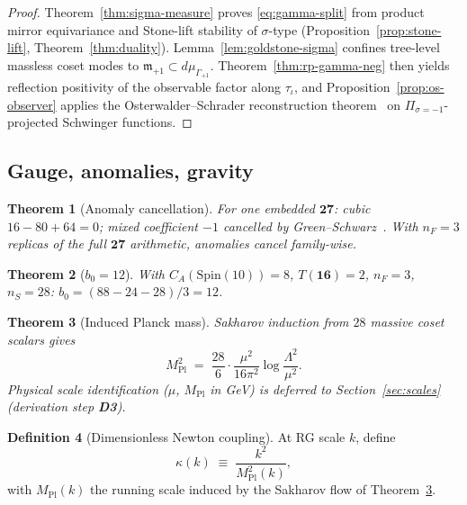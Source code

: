 \documentclass[11pt]{article}
\theoremstyle{plain}
\newtheorem{theorem}{Theorem}[section]
\theoremstyle{definition}
\newtheorem{definition}[theorem]{Definition}
\theoremstyle{remark}
\numberwithin{equation}{section}
\newcommand{\Spin}{\mathrm{Spin}}
\newcommand{\MPl}{M_{\mathrm{Pl}}}
\begin{document}
\begin{proof}
Theorem~\ref{thm:sigma-measure} proves \eqref{eq:gamma-split} from product
mirror equivariance and Stone-lift stability of $\sigma$-type
(Proposition~\ref{prop:stone-lift}, Theorem~\ref{thm:duality}).
Lemma~\ref{lem:goldstone-sigma} confines tree-level massless coset modes to
$\mathfrak{m}_{+1}\subset d\mu_{\Gamma_{+1}}$. Theorem~\ref{thm:rp-gamma-neg}
then yields reflection positivity of the observable factor along $\tau_\iota$,
and Proposition~\ref{prop:os-observer} applies the Osterwalder--Schrader
reconstruction theorem~\cite{OsterwalderSchrader1973} on
$\Pi_{\sigma=-1}$-projected Schwinger functions.
\end{proof}

\subsection{Gauge, anomalies, gravity}
\label{sec:physics:gauge}

\begin{theorem}[Anomaly cancellation]\label{thm:anomaly}
For one embedded $\mathbf{27}$: cubic $16-80+64=0$; mixed coefficient $-1$
cancelled by Green--Schwarz~\cite{GreenSchwarz1984}. With $n_F=3$ replicas of
the full $\mathbf{27}$ arithmetic, anomalies cancel family-wise.
\end{theorem}

\begin{theorem}[$b_0=12$]\label{thm:beta}
With $C_A(\Spin(10))=8$, $T(\mathbf{16})=2$, $n_F=3$, $n_S=28$:
$b_0=(88-24-28)/3=12$.
\end{theorem}

\begin{theorem}[Induced Planck mass]\label{thm:planck}
Sakharov induction from $28$ massive coset scalars gives
\begin{equation}\label{eq:planck}
  \MPl^2
  \;=\;
  \frac{28}{6}\cdot\frac{\mu^2}{16\pi^2}
  \log\frac{\Lambda^2}{\mu^2}.
\end{equation}
Physical scale identification ($\mu$, $\MPl$ in GeV) is deferred to
Section~\ref{sec:scales} (derivation step \textbf{D3}).
\end{theorem}

\begin{definition}[Dimensionless Newton coupling]\label{def:kappa}
At RG scale $k$, define
\begin{equation}\label{eq:kappa-def}
  \kappa(k)\;\equiv\;\frac{k^2}{\MPl^2(k)},
\end{equation}
with $\MPl(k)$ the running scale induced by the Sakharov flow of
Theorem~\ref{thm:planck}.
\end{definition}
\end{document}
